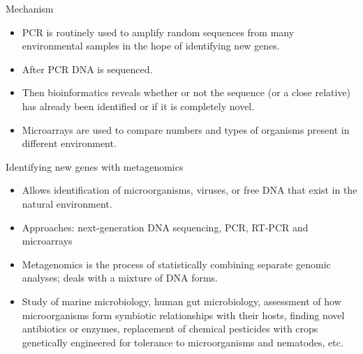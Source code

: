 \documentclass[ignorenonframetext,aspectratio=169]{beamer}
\providecommand{\tightlist}{%
  \setlength{\itemsep}{0pt}\setlength{\parskip}{0pt}}
\begin{document}
\begin{frame}{Mechanism}
\protect\hypertarget{mechanism}{}

\begin{itemize}
\tightlist
\item
  PCR is routinely used to amplify random sequences from many
  environmental samples in the hope of identifying new genes.
\item
  After PCR DNA is sequenced.
\item
  Then bioinformatics reveals whether or not the sequence (or a close
  relative) has already been identified or if it is completely novel.
\item
  Microarrays are used to compare numbers and types of organisms present
  in different environment.
\end{itemize}

\end{frame}

\begin{frame}{Identifying new genes with metagenomics}
\protect\hypertarget{identifying-new-genes-with-metagenomics}{}

\begin{itemize}
\tightlist
\item
  Allows identification of microorganisms, viruses, or free DNA that
  exist in the natural environment.
\item
  Approaches: next-generation DNA sequencing, PCR, RT-PCR and
  microarrays
\item
  Metagenomics is the process of statistically combining separate
  genomic analyses; deals with a mixture of DNA forms.
\item
  Study of marine microbiology, human gut microbiology, assessment of
  how microorganisms form symbiotic relationships with their hosts,
  finding novel antibiotics or enzymes, replacement of chemical
  pesticides with crops genetically engineered for tolerance to
  microorganisms and nematodes, etc.
\end{itemize}

\end{frame}
\end{document}
